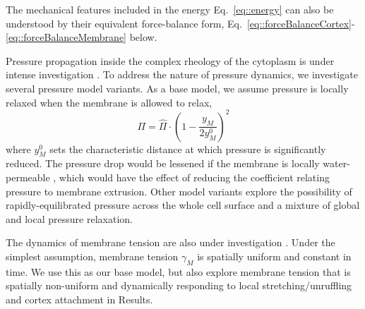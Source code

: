 The mechanical features included in the energy Eq.~\ref{eq::energy} can also be understood by their equivalent force-balance form, Eq.~\ref{eq::forceBalanceCortex}-\ref{eq::forceBalanceMembrane} below.

Pressure propagation inside the complex rheology of the cytoplasm is under intense investigation \cite{Charras:2005dm, Strychalski:2013eo, Sedzinski:2011ef}. To address the nature of pressure dynamics, we investigate several pressure model variants. As a base model, we assume pressure is locally relaxed when the membrane is allowed to relax, 
\begin{equation}
\Pi = \hat{\Pi}\cdot \left(1 - \frac{y_M}{2 y_M^0} \right)^2 \label{eq::localPressure}
\end{equation}
where $y_M^0$ sets the characteristic distance at which pressure is significantly reduced. The pressure drop would be lessened if the membrane is locally water-permeable \cite{Taloni:2015}, which would have the effect of reducing the coefficient relating pressure to membrane extrusion. Other model variants explore the possibility of rapidly-equilibrated pressure across the whole cell surface and a mixture of global and local pressure relaxation.  

The dynamics of membrane tension are also under investigation \cite{BenFogelson:2014gx,Peukes:2014fw,Tinevez:2009bh,Weiner:2007gd,Allard:2012if}. Under the simplest assumption, membrane tension $\gamma_M$ is spatially uniform and constant in time. We use this as our base model, but also explore membrane tension that is spatially non-uniform and dynamically responding to local stretching/unruffling and cortex attachment in Results. 

